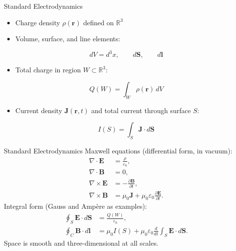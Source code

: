 \documentclass[11pt]{beamer}
\begin{document}
\begin{frame}{Standard Electrodynamics}
\begin{itemize}
  \item Charge density $\rho(\bm r)$ defined on $\mathbb{R}^3$
  \item Volume, surface, and line elements:
\end{itemize}
\begin{equation*}
  dV = d^3x, \qquad d\bm S, \qquad d\bm l
\end{equation*}
\begin{itemize}
  \item Total charge in region $W \subset \mathbb{R}^3$:
\end{itemize}
\begin{equation*}
  Q(W) = \int_W \rho(\bm r)\, dV
\end{equation*}
\begin{itemize}
  \item Current density $\bm J(\bm r, t)$ and total current through surface $S$:
\end{itemize}
\begin{equation*}
  I(S) = \int_S \bm J \cdot d\bm S
\end{equation*}
\end{frame}

\begin{frame}{Standard Electrodynamics}
Maxwell equations (differential form, in vacuum):
\begin{align*}
  \nabla \cdot \bm E &= \frac{\rho}{\varepsilon_0} , \\
  \nabla \cdot \bm B &= 0 , \\
  \nabla \times \bm E &= -\frac{\partial \bm B}{\partial t} , \\
  \nabla \times \bm B &= \mu_0 \bm J + \mu_0 \varepsilon_0 \frac{\partial \bm E}{\partial t} .
\end{align*}
Integral form (Gauss and Ampère as examples):
\begin{align*}
  \oint_S \bm E \cdot d\bm S &= \frac{Q(W)}{\varepsilon_0} , \\
  \oint_C \bm B \cdot d\bm l &= \mu_0 I(S) + \mu_0 \varepsilon_0 \frac{d}{dt} \int_S \bm E \cdot d\bm S .
\end{align*}
Space is smooth and three-dimensional at all scales.
\end{frame}
\end{document}
